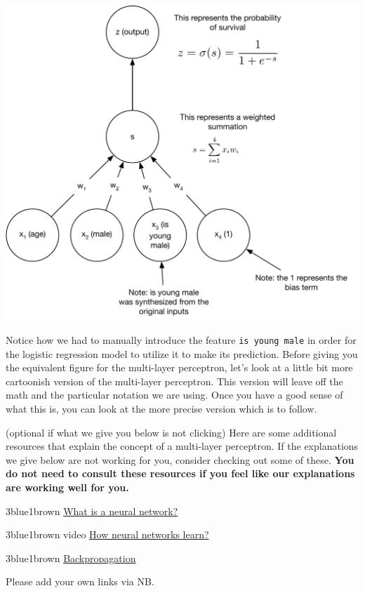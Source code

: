 \documentclass[assignment06_Solutions]{subfiles}
\begin{document}
\includegraphics[width=\linewidth]{figures/titaniclogisticregression}

Notice how we had to manually introduce the feature {\tt is young male} in order for the logistic regression model to utilize it to make its prediction.  Before giving you the equivalent figure for the multi-layer perceptron, let's look at a little bit more cartoonish version of the multi-layer perceptron.  This version will leave off the math and the particular notation we are using.  Once you have a good sense of what this is, you can look at the more precise version which is to follow.


\begin{externalresources}{(optional if what we give you below is not clicking)}
Here are some additional resources that explain the concept of a multi-layer perceptron.  If the explanations we give below are not working for you, consider checking out some of these.  \textbf{You do not need to consult these resources if you feel like our explanations are working well for you.}
\bi
\item 3blue1brown \href{https://www.youtube.com/watch?v=aircAruvnKk&t=6s}{What is a neural network?} 
\item 3blue1brown video \href{https://www.youtube.com/watch?v=IHZwWFHWa-w&list=PL_h2yd2CGtBHEKwEH5iqTZH85wLS-eUzv&index=2}{How neural networks learn?}
\item 3blue1brown \href{https://www.youtube.com/watch?v=Ilg3gGewQ5U}{Backpropagation}
\item Please add your own links via NB.
\ei
\end{externalresources}
\end{document}
